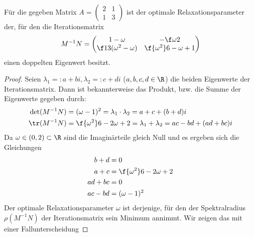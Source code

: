 \documentclass{mywork}
\begin{document}
\begin{aufgabe}
		\begin{lem*}
			Für die gegeben Matrix $A=\left(\begin{smallmatrix}2&1\\1&3\end{smallmatrix}\right)$ ist der optimale Relaxationsparameter der, für den die Iterationsmatrix
			\[
				M^{-1}N = \begin{pmatrix}1-\omega & -\f\omega2\\\f13(\omega^2-\omega)&\f{\omega^2}6-\omega +1\end{pmatrix}
			\]
			einen doppelten Eigenwert besitzt.
			\begin{proof}
				Seien $\lambda_1 =: a+bi, \lambda_2 =: c+di$ ($a,b,c,d\in\R$) die beiden Eigenwerte der Iterationsmatrix.
				Dann ist bekannterweise das Produkt, bzw. die Summe der Eigenwerte gegeben durch:
				\begin{align*}
					\det(M^{-1}N) &= (\omega-1)^2 = \lambda_1\cdot \lambda_2 = a+c+(b+d)i\\
					 \tr(M^{-1}N) &= \f{\omega^2}6 - 2\omega +2 = \lambda_1 + \lambda_2=ac-bd +(ad+bc)i
				\end{align*}
				Da $\omega\in(0,2)\subset \R$ sind die Imaginärteile gleich Null und es ergeben sich die Gleichungen
				\begin{align*}
					b + d &= 0\\
					a + c &= \f{\omega^2}6-2\omega+2\\
					ad+bc &= 0\\
					ac-bd &= (\omega-1)^2
				\end{align*}
				Der optimale Relaxationsparameter $\omega$ ist derjenige, für den der Spektralradius $\rho(M^{-1}N)$ der Iterationsmatrix sein Minimum annimmt.
				Wir zeigen das mit einer Fallunterscheidung


\end{proof}
\end{lem*}
\end{aufgabe}
\end{document}
